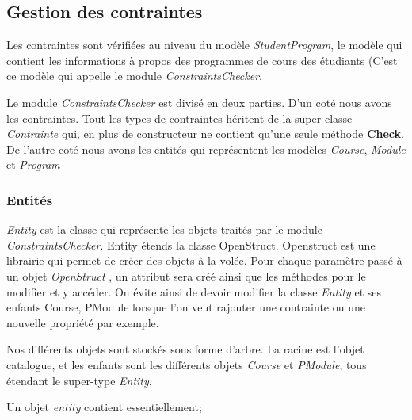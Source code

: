 \subsection{Gestion des contraintes}
Les contraintes sont vérifiées au niveau du modèle \textit{StudentProgram}, le modèle qui contient les informations à propos des programmes de cours des étudiants (C'est ce modèle qui appelle le module \textit{ConstraintsChecker}. 

Le module \textit{ConstraintsChecker} est divisé en deux parties. D'un coté nous avons les contraintes. Tout les types de contraintes héritent de la super classe \textit{Contrainte} qui, en plus de constructeur ne contient qu'une seule méthode \textbf{Check}. De l'autre coté nous avons les entités qui représentent les modèles \textit{Course}, \textit{Module} et \textit{Program}

\subsubsection{Entités}
\textit{Entity} est la classe qui représente les objets traités par le module \textit{ConstraintsChecker}. Entity étends la classe OpenStruct. Openstruct est une librairie qui permet de créer des objets à la volée. Pour chaque paramètre passé à un objet \textit{OpenStruct} \cite{OpenStruct}, un attribut sera créé ainsi que les méthodes pour le modifier et y accéder. On évite ainsi de devoir modifier la classe \textit{Entity} et ses enfants {Course, PModule} lorsque l'on veut rajouter une contrainte ou une nouvelle propriété par exemple.

Nos différents objets sont stockés sous forme d'arbre. La racine est l'objet catalogue, et les enfants sont les différents objets \textit{Course} et \textit{PModule}, tous étendant le super-type \textit{Entity}.

Un objet \textit{entity} contient essentiellement;

